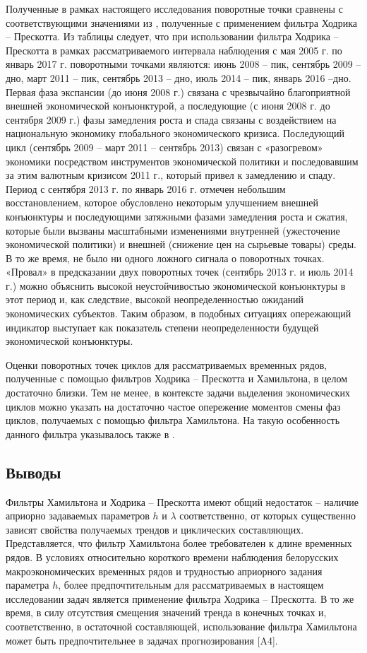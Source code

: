 \documentclass[a4paper,14pt]{extreport}
\begin{document}
	Полученные в рамках настоящего исследования поворотные точки сравнены с соответствующими значениями из \cite{esiMakingAlt}, полученные с применением фильтра Ходрика -- Прескотта. Из таблицы следует, что при использовании фильтра Ходрика -- Прескотта  в   рамках рассматриваемого интервала наблюдения с мая 2005 г. по январь 2017 г. поворотными точками являются: июнь 2008 -- пик, сентябрь 2009 -- дно, март 2011 -- пик, сентябрь 2013 -- дно, июль 2014 -- пик, январь 2016 --дно. Первая фаза экспансии (до июня 2008 г.) связана с чрезвычайно благоприятной внешней экономической конъюнктурой, а последующие (с июня 2008 г. до сентября 2009 г.) фазы замедления роста и спада связаны с воздействием на национальную экономику глобального экономического кризиса. Последующий цикл (сентябрь 2009 -- март 2011 -- сентябрь 2013) связан с «разогревом» экономики посредством инструментов экономической политики и последовавшим за этим валютным кризисом 2011 г., который привел к замедлению и спаду. Период с сентября 2013 г. по январь 2016 г. отмечен небольшим восстановлением, которое обусловлено некоторым улучшением внешней конъюнктуры и последующими затяжными фазами замедления роста и сжатия, которые были вызваны масштабными изменениями внутренней (ужесточение экономической политики) и внешней (снижение цен на сырьевые товары) среды. В то же время, не было ни одного ложного сигнала о поворотных точках. «Провал» в предсказании двух поворотных точек (сентябрь 2013 г. и июль 2014 г.) можно объяснить высокой неустойчивостью экономической конъюнктуры в этот период и, как следствие, высокой неопределенностью ожиданий экономических субъектов. Таким образом, в подобных ситуациях опережающий индикатор выступает как показатель степени неопределенности будущей экономической конъюнктуры.
	
	Оценки поворотных точек циклов для рассматриваемых временных рядов, полученные с помощью фильтров Ходрика -- Прескотта и Хамильтона, в целом достаточно близки. Тем не менее, в контексте задачи выделения экономических циклов можно указать на достаточно частое опережение моментов смены фаз циклов, получаемых с помощью фильтра Хамильтона. На такую особенность данного фильтра указывалось также в \cite{schuler_detrend}.
	
	\subsection{Выводы}
	
	Фильтры Хамильтона и Ходрика -- Прескотта  имеют  общий недостаток -- наличие априорно задаваемых параметров $h$ и $\lambda$ соответственно, от которых существенно зависят свойства получаемых трендов и циклических составляющих. Представляется, что фильтр Хамильтона более требователен к длине временных рядов.  В условиях относительно короткого времени наблюдения белорусских макроэкономических временных рядов и трудностью априорного задания параметра $h$, более предпочтительным для рассматриваемых в настоящем исследовании задач является применение фильтра Ходрика -- Прескотта. В то же время, в силу отсутствия смещения значений тренда в конечных точках и, соответственно, в остаточной составляющей, использование фильтра Хамильтона может быть предпочтительнее в  задачах прогнозирования [A4].
	
\end{document}
